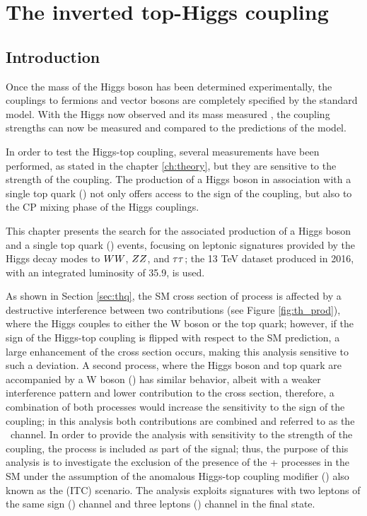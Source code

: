 \setcounter{chapter}{5}
\chapter[The inverted top-Higgs coupling]{The inverted top-Higgs coupling}\label{ch:analysis}

\section{Introduction}\label{sec:Intro_analysis}

Once the mass of the Higgs boson has been determined experimentally, the couplings to fermions and vector bosons are completely specified by the standard model. With the Higgs now observed and its mass measured \cite{h_mass}, the coupling strengths can now be measured and compared to the predictions of the model.

In order to test the Higgs-top coupling, several measurements have been performed, as stated in the chapter \ref{ch:theory}, but they are sensitive to the strength of the coupling. The production of a Higgs boson in association with a single top quark (\tH) not only offers access to the sign of the coupling, but also to the CP mixing phase of the Higgs couplings.

This chapter presents the search for the associated production of a Higgs boson and a single top quark (\tHq) events, focusing on leptonic signatures provided by the Higgs decay modes to $WW$, $ZZ$, and $\tau\tau$; the 13 TeV dataset produced in 2016, with an integrated luminosity of 35.9\fbinv, is used.

As shown in Section \ref{sec:thq}, the SM cross section of \tHq process is affected by a destructive interference between two contributions (see Figure \ref{fig:th_prod}), where the Higgs couples to either the W boson or the top quark; however, if the sign of the Higgs-top coupling is flipped with respect to the SM prediction, a large enhancement of the cross section occurs, making this analysis sensitive to such a deviation. A second process, where the Higgs boson and top quark are accompanied by a W boson (\tHW) has similar behavior, albeit with a weaker interference pattern and lower contribution to the cross section, therefore, a combination of both processes would increase the sensitivity to the sign of the coupling; in this analysis both contributions are combined and referred to as the \tH\ channel. In order to provide the analysis with sensitivity to the strength of the coupling, the \ttH process is included as part of the signal; thus, the purpose of this analysis is to investigate the exclusion of the presence of the \tH + \ttH processes in the SM under the assumption of the anomalous Higgs-top coupling modifier () also known as the  (ITC) scenario. The analysis exploits signatures with two leptons of the same sign () channel and three leptons () channel in the final state.

